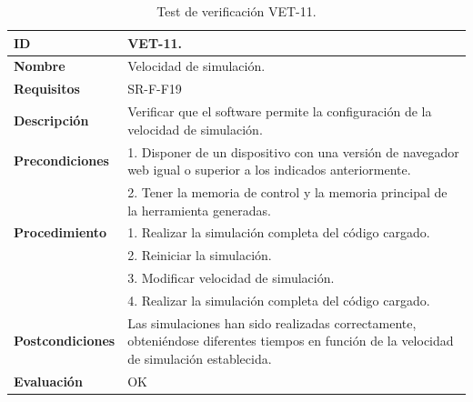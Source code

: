 \begin{center}
\begin{table}[htb]
\centering
\caption{Test de verificación VET-11.}
\begin{tabular}{@{}p{2.5cm} p{13cm}@{}} 
\toprule
\textbf{ID} 					& VET-11. \\
\midrule
\textbf{Nombre} 				& Velocidad de simulación. \\
\midrule
\textbf{Requisitos} 		& SR-F-F19\\
\midrule
\textbf{Descripción} 		& Verificar que el \gls{software} permite la configuración de la velocidad de simulación. \\
\midrule
\textbf{Precondiciones}		& 1. Disponer de un dispositivo con una versión de navegador web igual o superior a los indicados anteriormente. \\
											& 2. Tener la memoria de control y la memoria principal de la herramienta generadas. \\
\midrule
\textbf{Procedimiento}		& 1. Realizar la simulación completa del código cargado.\\
											& 2. Reiniciar la simulación.\\
											& 3. Modificar velocidad de simulación. \\
											& 4. Realizar la simulación completa del código cargado.\\
\midrule
\textbf{Postcondiciones} 		&  Las simulaciones han sido realizadas correctamente, obteniéndose diferentes tiempos en función de la velocidad de simulación establecida.\\
\midrule
\textbf{Evaluación} 			& OK \\
\bottomrule
\end{tabular}
\label{tab:vet11}
\end{table}
\end{center}

